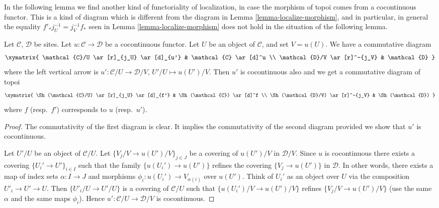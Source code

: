 \noindent
In the following lemma we find another kind of functoriality of
localization, in case the morphism of topoi comes from a
cocontinuous functor. This is a kind of diagram which is different
from the diagram in
Lemma \ref{lemma-localize-morphism},
and in particular, in general the equality $f'_*j_U^{-1} = j_V^{-1}f_*$ seen in
Lemma \ref{lemma-localize-morphism}
does not hold in the situation of the following lemma.

\begin{lemma}
\label{lemma-localize-cocontinuous}
Let $\mathcal{C}$, $\mathcal{D}$ be sites.
Let $u : \mathcal{C} \to \mathcal{D}$ be a cocontinuous functor.
Let $U$ be an object of $\mathcal{C}$, and set $V = u(U)$.
We have a commutative diagram
$$
\xymatrix{
\mathcal{C}/U \ar[r]_{j_U} \ar[d]_{u'} & \mathcal{C} \ar[d]^u \\
\mathcal{D}/V \ar[r]^-{j_V} & \mathcal{D}
}
$$
where the left vertical arrow is
$u' : \mathcal{C}/U \to \mathcal{D}/V$, $U'/U \mapsto u(U')/V$.
Then $u'$ is cocontinuous also and we get a commutative diagram of topoi
$$
\xymatrix{
\Sh(\mathcal{C}/U) \ar[r]_{j_U} \ar[d]_{f'} &
\Sh(\mathcal{C}) \ar[d]^f \\
\Sh(\mathcal{D}/V) \ar[r]^-{j_V} &
\Sh(\mathcal{D})
}
$$
where $f$ (resp.\ $f'$) corresponds to $u$ (resp.\ $u'$).
\end{lemma}

\begin{proof}
The commutativity of the first diagram is clear.
It implies the commutativity of the second diagram provided we
show that $u'$ is cocontinuous.

\medskip\noindent
Let $U'/U$ be an object of $\mathcal{C}/U$.
Let $\{V_j/V \to u(U')/V\}_{j \in J}$ be a covering of $u(U')/V$
in $\mathcal{D}/V$. Since $u$ is cocontinuous there exists a
covering $\{U_i' \to U'\}_{i \in I}$ such that the family
$\{u(U_i') \to u(U')\}$ refines the covering
$\{V_j \to u(U')\}$ in $\mathcal{D}$. In other words, there exists
a map of index sets $\alpha : I \to J$ and morphisms
$\phi_i : u(U_i') \to V_{\alpha(i)}$ over $u(U')$.
Think of $U_i'$ as an object over
$U$ via the composition $U'_i \to U' \to U$. Then
$\{U'_i/U \to U'/U\}$ is a covering of $\mathcal{C}/U$ such that
$\{u(U_i')/V \to u(U')/V\}$ refines $\{V_j/V \to u(U')/V\}$
(use the same $\alpha$ and the same maps $\phi_i$). Hence
$u' : \mathcal{C}/U \to \mathcal{D}/V$ is cocontinuous.
\end{proof}

